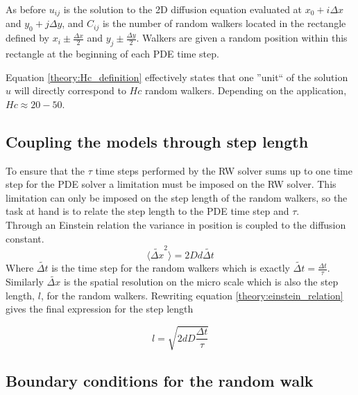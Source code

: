 \noindent As before $u_{ij}$ is the solution to the 2D diffusion equation evaluated at $x_0 +i\Delta x$ and $y_0 +j\Delta y$, and $C_{ij}$ is the number of random walkers located in the rectangle defined by $x_i\pm\frac{\Delta x}{2}$ and $y_j\pm\frac{\Delta y}{2}$. 
Walkers are given a random position within this rectangle at the beginning of each PDE time step. 

Equation \eqref{theory:Hc_definition} effectively states that one ''unit`` of the solution $u$ will directly correspond to $Hc$ random walkers. Depending on the application, $Hc \approx 20-50$.

\subsection{Coupling the models through step length}

To ensure that the $\tau$ time steps performed by the RW solver sums up to one time step for the PDE solver a limitation must be imposed on the RW solver. 
This limitation can only be imposed on the step length of the random walkers, so the task at hand is to relate the step length to the PDE time step and $\tau$. \\
Through an Einstein relation the variance in position is coupled to the diffusion constant.
\begin{equation}\label{theory:einstein_relation}
 \langle\tilde{\Delta x}^2\rangle = 2Dd\tilde{\Delta t}
\end{equation}
Where $\tilde{\Delta t}$ is the time step for the random walkers which is exactly $\tilde{\Delta t} = \frac{\Delta t}{\tau}$. 
Similarly $\tilde{\Delta x}$ is the spatial resolution on the micro scale which is also the step length, $l$, for the random walkers. 
Rewriting equation \eqref{theory:einstein_relation} gives the final expression for the step length

\begin{equation}\label{theory:step_length}
 l = \sqrt{2dD\frac{\Delta t}{\tau}}
\end{equation}

\subsection{Boundary conditions for the random walk}\label{theory:BC_RW}

